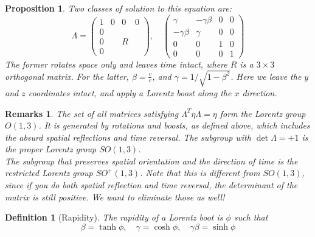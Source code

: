 \documentclass[a4paper]{article}
\newtheorem{remarks}{Remarks}[section]
\theoremstyle{new}
\newtheorem{defi}{Definition}[section]
\newtheorem{prop}{Proposition}[section]
\begin{document}
\begin{prop}
Two classes of solution to this equation are:
$$\Lambda =
  \begin{pmatrix}
    1 & 0 & 0 & 0\\
    0\\
    0 & & R\\
    0
  \end{pmatrix},\quad \begin{pmatrix}
    \gamma & -\gamma \beta & 0 & 0\\
    -\gamma\beta & \gamma & 0 & 0\\
    0 & 0 & 1 & 0\\
    0 & 0 & 0 & 1
  \end{pmatrix}$$
The former rotates space only and leaves time intact, where $R$ is a $3\times 3$ orthogonal matrix. For the latter, $\beta = \frac{v}{c}$, and $\gamma = 1/\sqrt{1 - \beta^2}$. Here we leave the $y$ and $z$ coordinates intact, and apply a Lorentz boost along the $x$ direction.
\end{prop}
\begin{remarks}
The set of all matrices satisfying $\Lambda^T\eta\Lambda=\eta$ form the Lorentz group $O(1, 3)$. It is generated by rotations and boosts, as defined above, which includes the absurd spatial reflections and time reversal. The subgroup with $\det \Lambda = +1$ is the proper Lorentz group $SO(1, 3)$.\\[5pt]
The subgroup that preserves spatial orientation and the direction of time is the restricted Lorentz group $SO^+(1, 3)$. Note that this is different from $SO(1, 3)$, since if you do both spatial reflection and time reversal, the determinant of the matrix is still positive. We want to eliminate those as well!
\end{remarks}
\begin{defi}[Rapidity]
  The rapidity of a Lorentz boot is $\phi$ such that
\begin{equation}
    \beta = \tanh \phi,\quad \gamma = \cosh\phi,\quad \gamma\beta=\sinh \phi\label{rapidity}
\end{equation}
\end{defi}
\end{document}
